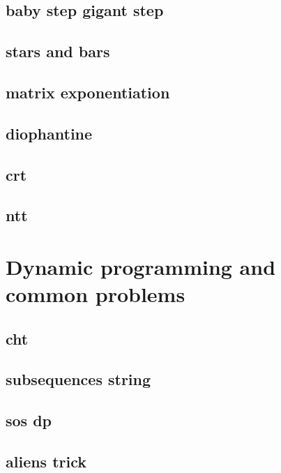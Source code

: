 \subsection{baby step gigant step}
\raggedbottom
\hrulefill
\subsection{stars and bars}
\raggedbottom
\hrulefill
\subsection{matrix exponentiation}
\raggedbottom
\hrulefill
\subsection{diophantine}
\raggedbottom
\hrulefill
\subsection{crt}
\raggedbottom
\hrulefill
\subsection{ntt}
\raggedbottom
\hrulefill

\section{Dynamic programming and common problems}
\subsection{cht}
\raggedbottom
\hrulefill
\subsection{subsequences string}
\raggedbottom
\hrulefill
\subsection{sos dp}
\raggedbottom
\hrulefill
\subsection{aliens trick}
\raggedbottom
\hrulefill
